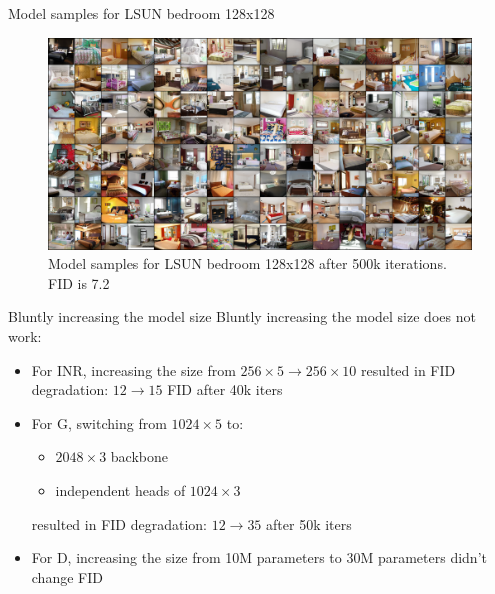 \documentclass[10pt]{beamer}
\begin{document}
\begin{frame}{Model samples for LSUN bedroom 128x128}
\begin{figure}
    \centering
    \includegraphics[width=\textwidth]{images/best-model-samples-august-30}
    \caption{Model samples for LSUN bedroom 128x128 after 500k iterations. FID is 7.2}
\end{figure}    
\end{frame}


\begin{frame}{Bluntly increasing the model size}
Bluntly increasing the model size does not work:
\begin{itemize}
    \item\pause For INR, increasing the size from $256 \times 5 \to 256 \times 10$ resulted in FID degradation: $12 \to 15$ FID after 40k iters
    \item\pause For G, switching from $1024 \times 5$ to:
    \begin{itemize}
        \item\pause $2048 \times 3$ backbone
        \item{} independent heads of $1024 \times 3$
    \end{itemize}
    resulted in FID degradation: $12 \to 35$ after 50k iters
    \item\pause For D, increasing the size from 10M parameters to 30M parameters didn't change FID
\end{itemize}
\end{frame}
\end{document}
